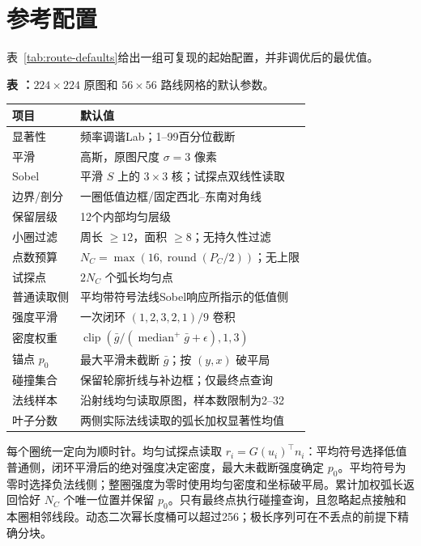 \section{参考配置}

\footnotesize

表~\ref{tab:route-defaults}给出一组可复现的起始配置，并非调优后的最优值。

\begin{center}
\label{tab:route-defaults}
\begin{minipage}{\columnwidth}
\centering
\small\textbf{表 \thetable：}$224\times224$ 原图和 $56\times56$ 路线网格的默认参数。

\vspace{2pt}
\scriptsize
\begin{tabular}{@{}p{}p{}@{}}
\toprule
项目 & 默认值 \\
\midrule
显著性 & 频率调谐Lab；1--99百分位截断 \\
平滑 & 高斯，原图尺度 $\sigma=3$ 像素 \\
Sobel & 平滑 $S$ 上的 $3\times3$ 核；试探点双线性读取 \\
边界/剖分 & 一圈低值边框/固定西北--东南对角线 \\
保留层级 & 12个内部均匀层级 \\
小圈过滤 & 周长 $\geq12$，面积 $\geq8$；无持久性过滤 \\
点数预算 & $N_C=\max(16,\operatorname{round}(P_C/2))$；无上限 \\
试探点 & $2N_C$ 个弧长均匀点 \\
普通读取侧 & 平均带符号法线Sobel响应所指示的低值侧 \\
强度平滑 & 一次闭环 $(1,2,3,2,1)/9$ 卷积 \\
密度权重 & $\operatorname{clip}(\bar g/(\operatorname{median}^{+}\bar g+\epsilon),1,3)$ \\
锚点 $p_0$ & 最大平滑未截断 $\bar g$；按 $(y,x)$ 破平局 \\
碰撞集合 & 保留轮廓折线与补边框；仅最终点查询 \\
法线样本 & 沿射线均匀读取原图，样本数限制为2--32 \\
叶子分数 & 两侧实际法线读取的弧长加权显著性均值 \\
\bottomrule
\end{tabular}
\end{minipage}
\end{center}

每个圈统一定向为顺时针。均匀试探点读取 $r_i=G(u_i)^{\top}n_i$：平均符号选择低值普通侧，闭环平滑后的绝对强度决定密度，最大未截断强度确定 $p_0$。平均符号为零时选择负法线侧；整圈强度为零时使用均匀密度和坐标破平局。累计加权弧长返回恰好 $N_C$ 个唯一位置并保留 $p_0$。只有最终点执行碰撞查询，且忽略起点接触和本圈相邻线段。动态二次幂长度桶可以超过256；极长序列可在不丢点的前提下精确分块。

